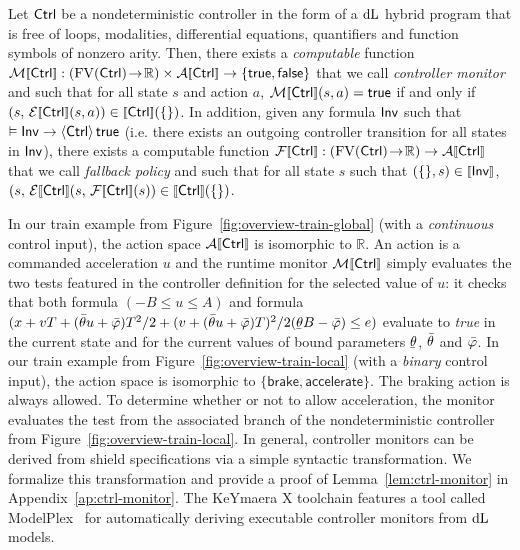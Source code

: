 \documentclass[acmsmall,screen,nonacm]{acmart}
\begin{document}
\begin{lemma} \label{lem:ctrl-monitor} Let $\mathsf{Ctrl}$ be a nondeterministic controller in the form of a $\mathop{}\!\mathrm{d} \text{L}$ hybrid program that is free of loops, modalities, differential equations, quantifiers and function symbols of nonzero arity. Then, there exists a \emph{computable} function $\CtrlMonitorSem{\Ctrl} : (\FV(\Ctrl) \toI \Reals) \times \CtrlActionSem{\Ctrl} \to \{\True, \False\}$ that we call \emph{controller monitor} and such that for all state $s$ and action $a$, $\CtrlMonitorSem{\Ctrl}(s, a) = \True$ if and only if $(s, \,\CtrlExeSem{\Ctrl}(s, a)) \in \sem{\Ctrl}(\EmptyValuation)$. In addition, given any formula $\mathsf{Inv}$ such that $\vDash \mathsf{Inv} \rightarrow \langle\mathsf{Ctrl}\rangle\,\mathsf{true}$ (i.e. there exists an outgoing controller transition for all states in $\mathsf{Inv}$), there exists a computable function $\CtrlFallbackSem{\Ctrl} : (\FV(\Ctrl) \toI \Reals) \to \CtrlActionSem{\Ctrl}$ that we call \emph{fallback policy} and such that for all state $s$ such that $(\EmptyValuation, s) \in \sem{\Inv}$, $(s, \,\CtrlExeSem{\Ctrl}(s, \,\CtrlFallbackSem{\Ctrl}(s)) \in \sem{\Ctrl}(\EmptyValuation)$.
\end{lemma}


In our train example from Figure~\ref{fig:overview-train-global} (with a \emph{continuous} control input), the action space $\CtrlActionSem{\Ctrl}$ is isomorphic to $\mathbb{R}$. An action is a commanded acceleration $u$ and the runtime monitor $\CtrlMonitorSem{\Ctrl}$ simply evaluates the two tests featured in the controller definition for the selected value of $u$: it checks that both formula $(-B \!\le\! u \!\le\! A)$ and formula \( (x + vT + (\TrainThetaAcc)T^2/2 + (v + (\TrainThetaAcc)T)^2/2(\TrainThetaBrakingRate) \le e) \) evaluate to \emph{true} in the current state and for the current values of bound parameters $\TrainThetaSlopeMin$, $\bar{\theta}$ and $\bar{\varphi}$.
In our train example from Figure~\ref{fig:overview-train-local} (with a \emph{binary} control input), the action space is isomorphic to $\{\textsf{brake}, \textsf{accelerate}\}$. The braking action is always allowed. To determine whether or not to allow acceleration, the monitor evaluates the test from the associated branch of the nondeterministic controller from Figure~\ref{fig:overview-train-local}. In general, controller monitors can be derived from shield specifications via a simple syntactic transformation. We formalize this transformation and provide a proof of Lemma~\ref{lem:ctrl-monitor} in Appendix~\ref{ap:ctrl-monitor}. The KeYmaera X toolchain features a tool called ModelPlex~\cite{DBLP:journals/fmsd/MitschP16} for automatically deriving executable controller monitors from $\mathop{}\!\mathrm{d} \text{L}$ models.
\end{document}
